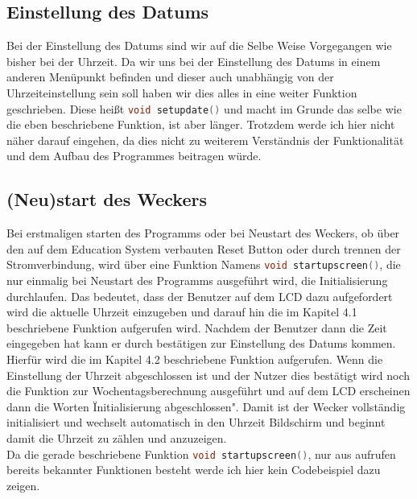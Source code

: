 \documentclass[openright,twoside,12pt,a4paper]{scrartcl}
\begin{document}
\begin{flushleft}
	 	\subsection{Einstellung des Datums}
	 	Bei der Einstellung des Datums sind wir auf die Selbe Weise Vorgegangen wie bisher bei der Uhrzeit. Da wir uns bei der Einstellung des Datums in einem anderen Menüpunkt befinden und dieser auch unabhängig von der Uhrzeiteinstellung sein soll haben wir dies alles in eine weiter Funktion geschrieben. Diese heißt \lstinline[language=c++,]|void setupdate()| und macht im Grunde das selbe wie die eben beschriebene Funktion, ist aber länger. Trotzdem werde ich hier nicht näher darauf eingehen, da dies nicht zu weiterem Verständnis der Funktionalität und dem Aufbau des Programmes beitragen würde.
	 	\subsection{(Neu)start des Weckers}
	 	Bei erstmaligen starten des Programms oder bei Neustart des Weckers, ob über den auf dem Education System verbauten Reset Button oder durch trennen der Stromverbindung, wird über eine Funktion Namens \lstinline[language=c++]|void startupscreen()|, die nur einmalig bei Neustart des Programms ausgeführt wird, die Initialisierung durchlaufen. Das bedeutet, dass der Benutzer auf dem LCD dazu aufgefordert wird die aktuelle Uhrzeit einzugeben und darauf hin die im Kapitel 4.1 beschriebene Funktion aufgerufen wird. Nachdem der Benutzer dann die Zeit eingegeben hat kann er durch bestätigen zur Einstellung des Datums kommen. Hierfür wird die im Kapitel 4.2 beschriebene Funktion aufgerufen. Wenn die Einstellung der Uhrzeit abgeschlossen ist und der Nutzer dies bestätigt wird noch die Funktion zur Wochentagsberechnung ausgeführt und auf dem LCD erscheinen dann die Worten \"Initialisierung abgeschlossen". Damit ist der Wecker vollständig initialisiert und wechselt automatisch in den Uhrzeit Bildschirm und beginnt damit die Uhrzeit zu zählen und anzuzeigen. \\
	 	Da die gerade beschriebene Funktion \lstinline[language=c++]|void startupscreen()|, nur aus aufrufen bereits bekannter Funktionen besteht werde ich hier kein Codebeispiel dazu zeigen. \\

\end{flushleft}
\end{document}
